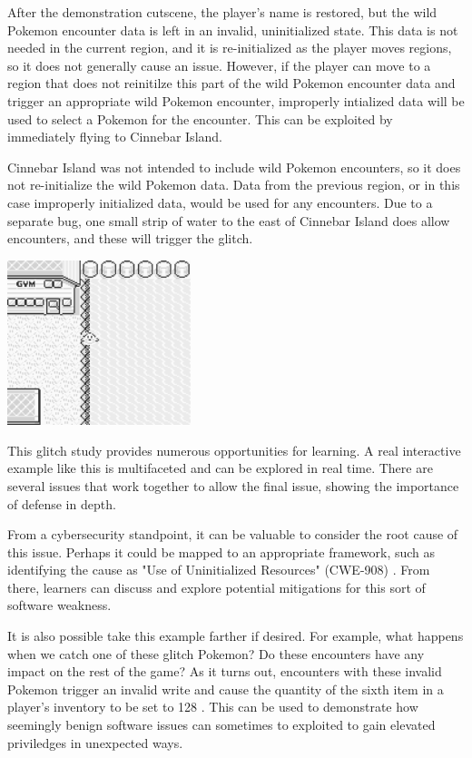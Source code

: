 \documentclass[letterpaper]{article}
\begin{document}
After the demonstration cutscene, the player's name is restored, but the wild Pokemon encounter data is left in an invalid, uninitialized state. This data is not needed in the current region, and it is re-initialized as the player moves regions, so it does not generally cause an issue. However, if the player can move to a region that does not reinitilze this part of the wild Pokemon encounter data and trigger an appropriate wild Pokemon encounter, improperly intialized data will be used to select a Pokemon for the encounter. This can be exploited by immediately flying to Cinnebar Island.

Cinnebar Island was not intended to include wild Pokemon encounters, so it does not re-initialize the wild Pokemon data. Data from the previous region, or in this case improperly initialized data, would be used for any encounters. Due to a separate bug, one small strip of water to the east of Cinnebar Island does allow encounters, and these will trigger the glitch.

\noindent %
\begin{minipage}{\textwidth}
    \centering
    \includegraphics[width=0.4\textwidth]{surfing.png}
    \label{fig:surfing}
\end{minipage}

This glitch study provides numerous opportunities for learning. A real interactive example like this is multifaceted and can be explored in real time. There are several issues that work together to allow the final issue, showing the importance of defense in depth.

From a cybersecurity standpoint, it can be valuable to consider the root cause of this issue. Perhaps it could be mapped to an appropriate framework, such as identifying the cause as "Use of Uninitialized Resources" (CWE-908) \cite{mitre2012}. From there, learners can discuss and explore potential mitigations for this sort of software weakness.

It is also possible take this example farther if desired. For example, what happens when we catch one of these glitch Pokemon? Do these encounters have any impact on the rest of the game? As it turns out, encounters with these invalid Pokemon trigger an invalid write and cause the quantity of the sixth item in a player's inventory to be set to 128 \cite{bulbapedia2010}. This can be used to demonstrate how seemingly benign software issues can sometimes to exploited to gain elevated priviledges in unexpected ways.
\end{document}
